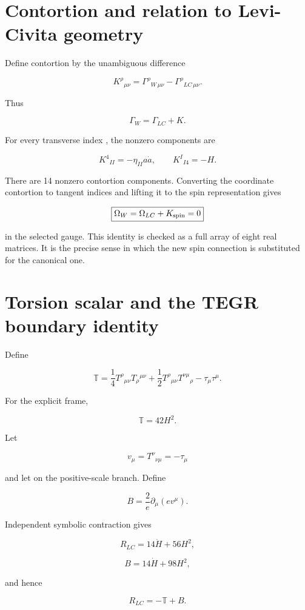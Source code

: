 \documentclass[11pt]{article}
\begin{document}
\section{Contortion and relation to Levi-Civita geometry}

Define contortion by the unambiguous difference

\[
\boxed{
K^\rho{}_{\mu\nu}
=\Gamma^\rho{}_{W\,\mu\nu}
-\Gamma^\rho{}_{LC\,\mu\nu}.}
\]

Thus

\[
\Gamma_W=\Gamma_{LC}+K.
\]

For every transverse index \texttt{}, the nonzero components are

\[
K^4{}_{II}=-\eta_{II}a\dot a,
\qquad
K^I{}_{I4}=-H.
\]

There are 14 nonzero contortion components. Converting the coordinate contortion to tangent indices and lifting it to the spin representation gives

\[
\boxed{\Omega_W=\Omega_{LC}+K_{\rm spin}=0}
\]

in the selected gauge. This identity is checked as a full array of eight real \texttt{} matrices. It is the precise sense in which the new spin connection is substituted for the canonical one.

\section{Torsion scalar and the TEGR boundary identity}

Define

\[
\mathbb T=
\frac14 T^\rho{}_{\mu\nu}T_\rho{}^{\mu\nu}
+\frac12 T^\rho{}_{\mu\nu}T^{\nu\mu}{}_\rho
-\tau_\mu\tau^\mu.
\]

For the explicit frame,

\[
\boxed{\mathbb T=42H^2.}
\]

Let

\[
v_\mu=T^\nu{}_{\nu\mu}=-\tau_\mu
\]

and let \texttt{} on the positive-scale branch. Define

\[
B=\frac{2}{e}\partial_\mu(ev^\mu).
\]

Independent symbolic contraction gives

\[
R_{LC}=14\dot H+56H^2,
\]

\[
B=14\dot H+98H^2,
\]

and hence

\[
\boxed{R_{LC}=-\mathbb T+B.}
\]
\end{document}
